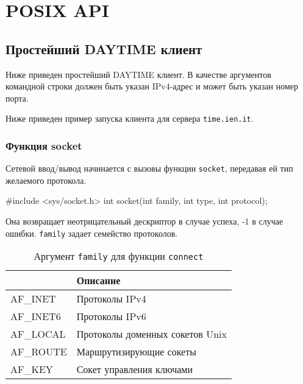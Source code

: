 \section{POSIX API}
\label{sec:network-api}

\subsection{Простейший DAYTIME клиент}
Ниже приведен простейший DAYTIME клиент. В качестве аргументов командной строки должен быть указан IPv4-адрес и может быть указан номер порта.



Ниже приведен пример запуска клиента для сервера \texttt{time.ien.it}.


\subsubsection{Функция socket}
Сетевой ввод/вывод начинается с вызовы функции \lstinline{socket}, передавая ей тип желаемого протокола.
\begin{clst}{}{}
#include <sys/socket.h>
int socket(int family, int type, int protocol);
\end{clst}

Она возвращает неотрицательный дескриптор в случае успеха, -1 в случае ошибки. \lstinline{family} задает семейство протоколов.
\begin{table}[h!]
  \caption{Аргумент \lstinline{family} для функции \lstinline{connect}}
  \begin{center}
    \begin{tabular}{p{2.5cm}l}
      \toprule
      & \textbf{Описание} \\
      \midrule
      AF\_INET & Протоколы IPv4 \\
      AF\_INET6 & Протоколы IPv6 \\
      AF\_LOCAL & Протоколы доменных сокетов Unix \\
      AF\_ROUTE & Маршрутизирующие сокеты \\
      AF\_KEY & Сокет управления ключами \\
      \bottomrule
    \end{tabular}
  \end{center}
\end{table}

